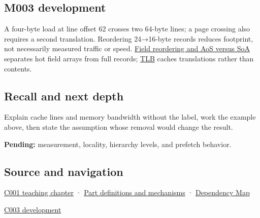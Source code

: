 \subsection{M003 development}\label{appendix-e4ccdbab8320-m003-development}

A four-byte load at line offset 62 crosses two 64-byte lines; a page crossing also requires a second translation. Reordering 24→16-byte records reduces footprint, not necessarily measured traffic or speed. \hyperref[appendix-5522ad176ca0]{Field reordering and AoS versus SoA} separates hot field arrays from full records; \hyperref[appendix-7a2d9c5ce511]{TLB} caches translations rather than contents.

\subsection{Recall and next depth}\label{appendix-e4ccdbab8320-recall-and-next-depth}

Explain cache lines and memory bandwidth without the label, work the example above, then state the assumption whose removal would change the result.

\textbf{Pending:} measurement, locality, hierarchy levels, and prefetch behavior.

\subsection{Source and navigation}\label{appendix-e4ccdbab8320-source-and-navigation}

\hyperref[01-foundations-i-ch001-from-a-signal-to-an-interpretation]{C001 teaching chapter} · \hyperref[appendix-fd090d982a15]{Part definitions and mechanisms} · \hyperref[appendix-4ad47bdd269a]{Dependency Map}

\hyperref[01-foundations-i-ch002-where-the-bytes-live]{C003 development}
